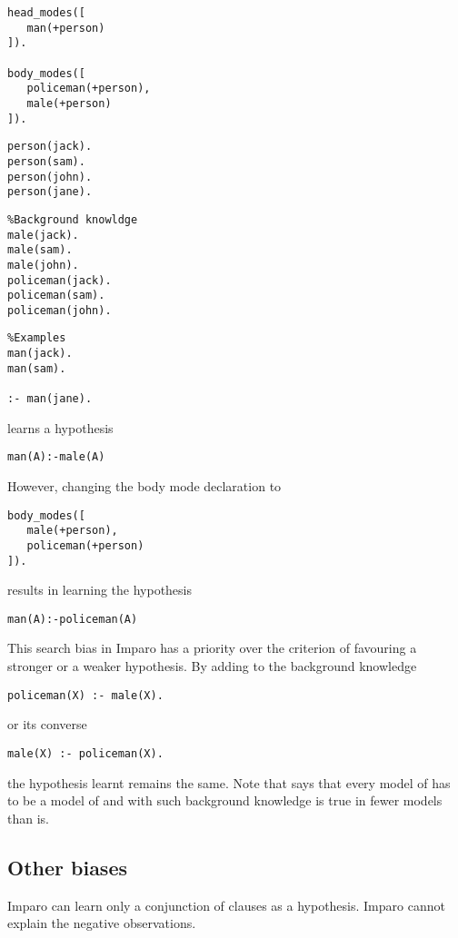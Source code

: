 \begin{minipage}[t]{.25\textwidth}
\begin{lstlisting}
head_modes([
   man(+person)
]).

body_modes([
   policeman(+person),
   male(+person)
]).
\end{lstlisting}
\end{minipage}
\begin{minipage}[t]{.20\textwidth}
\begin{lstlisting}
person(jack).
person(sam).
person(john).
person(jane).
\end{lstlisting}
\end{minipage}
\begin{minipage}[t]{.30\textwidth}
\begin{lstlisting}
%Background knowldge
male(jack).
male(sam).
male(john).
policeman(jack).
policeman(sam).
policeman(john).
\end{lstlisting}
\end{minipage}
\begin{minipage}[t]{.25\textwidth}
\begin{lstlisting}
%Examples
man(jack).
man(sam).

:- man(jane).
\end{lstlisting}
\end{minipage}


learns a hypothesis
\begin{lstlisting}
man(A):-male(A)
\end{lstlisting}
However, changing the body mode declaration to
\begin{lstlisting}
body_modes([   
   male(+person),
   policeman(+person)
]).
\end{lstlisting}
results in learning the hypothesis
\begin{lstlisting}
man(A):-policeman(A)
\end{lstlisting}

This search bias in Imparo has a priority over the criterion of favouring a stronger or a weaker hypothesis. By adding to the background knowledge
\begin{lstlisting}
policeman(X) :- male(X).
\end{lstlisting}
or its converse
\begin{lstlisting}
male(X) :- policeman(X).
\end{lstlisting}
the hypothesis learnt remains the same.
Note that  says that every model of  has to be a model of  and with such background knowledge  is true in fewer models than  is.

\subsection{Other biases}
Imparo can learn only a conjunction of clauses as a hypothesis.
Imparo cannot explain the negative observations.
